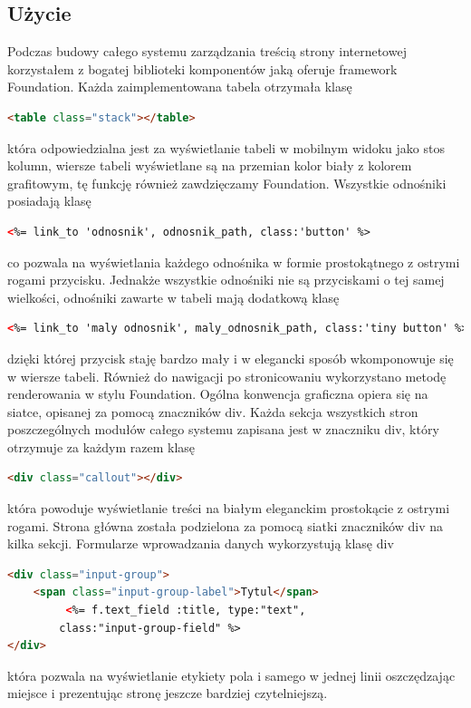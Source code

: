 \documentclass[openright]{xmgr}
\begin{document}
\subsection{Użycie}
Podczas budowy całego systemu zarządzania treścią strony internetowej korzystałem z bogatej biblioteki komponentów jaką oferuje framework Foundation. Każda zaimplementowana tabela otrzymała klasę 
\begin{lstlisting}[language=html]
<table class="stack"></table>
\end{lstlisting}
która odpowiedzialna jest za wyświetlanie tabeli w mobilnym widoku jako stos kolumn, wiersze tabeli wyświetlane są na przemian kolor biały z kolorem grafitowym, tę funkcję również  zawdzięczamy Foundation. Wszystkie odnośniki posiadają klasę 
\begin{lstlisting}[language=html]
<%= link_to 'odnosnik', odnosnik_path, class:'button' %>
\end{lstlisting}
co pozwala na wyświetlania każdego odnośnika w formie prostokątnego z ostrymi rogami przycisku. Jednakże wszystkie odnośniki nie są przyciskami o tej samej wielkości, odnośniki zawarte w tabeli mają dodatkową klasę 
\begin{lstlisting}[language=html]
<%= link_to 'maly odnosnik', maly_odnosnik_path, class:'tiny button' %>
\end{lstlisting}
dzięki której przycisk staję bardzo mały i w elegancki sposób wkomponowuje się w wiersze tabeli. Również do nawigacji po stronicowaniu wykorzystano metodę renderowania w stylu Foundation. Ogólna konwencja graficzna opiera się na siatce, opisanej za pomocą znaczników div. Każda sekcja wszystkich stron poszczególnych modułów całego systemu zapisana jest w znaczniku div, który otrzymuje za każdym razem klasę 
\begin{lstlisting}[language=html]
<div class="callout"></div>
\end{lstlisting}
która powoduje wyświetlanie treści na białym eleganckim prostokącie z ostrymi rogami. Strona główna została podzielona za pomocą siatki znaczników div na kilka sekcji. Formularze wprowadzania danych wykorzystują klasę div 
\begin{lstlisting}[language=html]
<div class="input-group">
	<span class="input-group-label">Tytul</span>
         <%= f.text_field :title, type:"text", 
		class:"input-group-field" %>
</div>
\end{lstlisting}
która pozwala na wyświetlanie etykiety pola i samego w jednej linii oszczędzając miejsce i prezentując stronę jeszcze bardziej czytelniejszą. 
\end{document}
